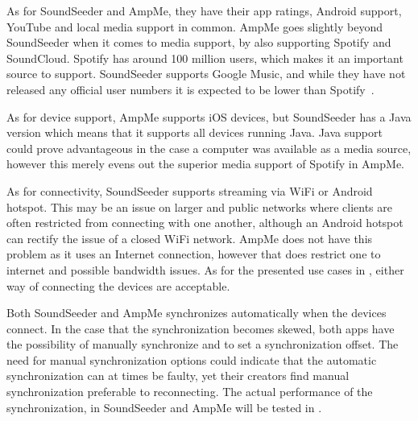 As for SoundSeeder and AmpMe, they have their app ratings, Android support, YouTube and local media support in common.
AmpMe goes slightly beyond SoundSeeder when it comes to media support, by also supporting Spotify and SoundCloud.
Spotify has around 100 million users, which makes it an important source to support\cite{spotify_subscribers}.
SoundSeeder supports Google Music, and while they have not released any official user numbers it is expected to be lower than Spotify~\cite{googlem_subscribers}.

As for device support, AmpMe supports iOS devices, but SoundSeeder has a Java version which means that it supports all devices running Java.
Java support could prove advantageous in the case a computer was available as a media source, however this merely evens out the superior media support of Spotify in AmpMe.

As for connectivity, SoundSeeder supports streaming via WiFi or Android hotspot.
This may be an issue on larger and public networks where clients are often restricted from connecting with one another, although an Android hotspot can rectify the issue of a closed WiFi network.
AmpMe does not have this problem as it uses an Internet connection, however that does restrict one to internet and possible bandwidth issues.
As for the presented use cases in , either way of connecting the devices are acceptable.

Both SoundSeeder and AmpMe synchronizes automatically when the devices connect.
In the case that the synchronization becomes skewed, both apps have the possibility of manually synchronize and to set a synchronization offset.
The need for manual synchronization options could indicate that the automatic synchronization can at times be faulty, yet their creators find manual synchronization preferable to reconnecting.
The actual performance of the synchronization, in SoundSeeder and AmpMe will be tested in .

